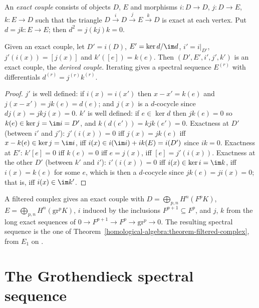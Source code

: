 \begin{definition}\label{homological-algebra:definition-exact-couple}
An \emph{exact couple} consists of objects $D$, $E$ and morphisms $i \colon D \to D$, $j \colon D \to E$, $k \colon E \to D$ such that the triangle
$D \xrightarrow{i} D \xrightarrow{j} E \xrightarrow{k} D$ is exact at each vertex. Put $d = jk \colon E \to E$; then $d^2 = j(kj)k = 0$.
\end{definition}

\begin{proposition}\label{homological-algebra:proposition-derived-couple}
Given an exact couple, let $D' = i(D)$, $E' = \ker d/\im d$, $i' = i|_{D'}$, $j'(i(x)) = [j(x)]$ and $k'([e]) = k(e)$. Then $(D', E', i', j', k')$
is an exact couple, the \emph{derived couple}. Iterating gives a spectral sequence $E^{(r)}$ with differentials $d^{(r)} = j^{(r)}k^{(r)}$.
\end{proposition}

\begin{proof}
$j'$ is well defined: if $i(x) = i(x')$ then $x - x' = k(e)$ and $j(x - x') = jk(e) = d(e)$; and $j(x)$ is a $d$-cocycle since
$dj(x) = jkj(x) = 0$. $k'$ is well defined: if $e \in \ker d$ then $jk(e) = 0$ so $k(e) \in \ker j = \im i = D'$, and $k(d(e')) = kjk(e') = 0$.
Exactness at $D'$ (between $i'$ and $j'$): $j'(i(x)) = 0$ iff $j(x) = jk(e)$ iff $x - k(e) \in \ker j = \im i$, iff $i(x) \in i(\im i) + ik(E) = i(D')$
since $ik = 0$. Exactness at $E'$: $k'[e] = 0$ iff $k(e) = 0$ iff $e = j(x)$, iff $[e] = j'(i(x))$. Exactness at the other $D'$
(between $k'$ and $i'$): $i'(i(x)) = 0$ iff $i(x) \in \ker i = \im k$, iff $i(x) = k(e)$ for some $e$, which is then a $d$-cocycle since
$jk(e) = ji(x) = 0$; that is, iff $i(x) \in \im k'$.
\end{proof}

\begin{remark}\label{homological-algebra:remark-exact-couple-filtered}
A filtered complex gives an exact couple with $D = \bigoplus_{p,n}H^n(F^pK)$, $E = \bigoplus_{p,n}H^n(\mathrm{gr}^pK)$, $i$ induced by the inclusions
$F^{p+1} \subseteq F^p$, and $j$, $k$ from the long exact sequences of $0 \to F^{p+1} \to F^p \to \mathrm{gr}^p \to 0$. The resulting spectral sequence is
the one of Theorem~\ref{homological-algebra:theorem-filtered-complex}, from $E_1$ on \cite[Section 5.9]{weibel-homological}.
\end{remark}

\section{The Grothendieck spectral sequence}\label{homological-algebra:section-grothendieck}


